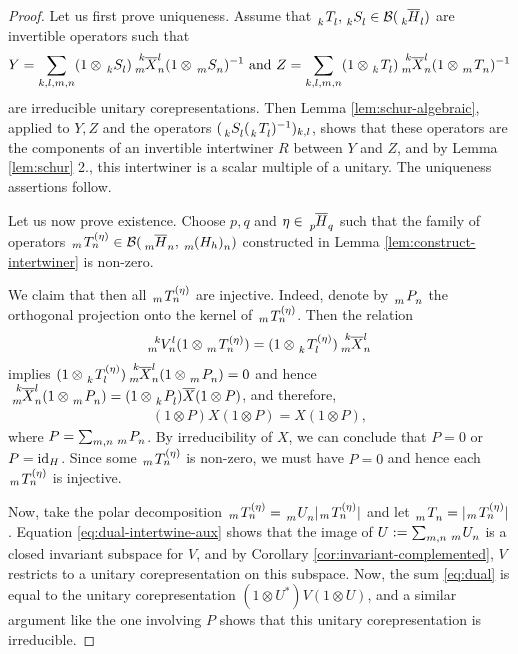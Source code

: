 \begin{proof}
Let us first prove uniqueness. Assume that $\Grd{T}{k}{l},\Grd{S}{k}{l} \in
\mathcal{B}(\Grd{\overline{H}}{k}{l})$ are invertible operators such that
\begin{align*}
  Y = \sum_{k,l,m,n} (1\otimes \Grd{S}{k}{l}) \Gr{\overline{X}}{k}{l}{m}{n} (1 \otimes
  \Grd{S}{m}{n})^{-1}  \text{ and }
  Z = \sum_{k,l,m,n} (1\otimes \Grd{T}{k}{l}) \Gr{\overline{X}}{k}{l}{m}{n} (1 \otimes
  \Grd{T}{m}{n})^{-1}
\end{align*}
are irreducible unitary corepresentations. Then Lemma \ref{lem:schur-algebraic}, applied to $Y,Z$
and the operators $(\Grd{S}{k}{l}(\Grd{T}{k}{l})^{-1})_{k,l}$, shows that these operators are the
components of an invertible intertwiner $R$ between $Y$ and $Z$, and by Lemma \ref{lem:schur} 2.,
this intertwiner is a scalar multiple of a unitary. The uniqueness assertions follow.

Let us now prove existence.  Choose $p,q$ and $\eta\in \Grd{\overline{H}}{p}{q}$ such that the
family of operators $\Gr{T}{}{(\eta)}{m}{n} \in
\mathcal{B}(\Grd{\overline{H}}{m}{n},\Grd{(H_{h})}{m}{n})$ constructed in Lemma
\ref{lem:construct-intertwiner} is non-zero.

We claim that then all $\Gr{T}{}{(\eta)}{m}{n}$ are injective.  Indeed, denote by $\Grd{P} {m}{n}$
the orthogonal projection onto the kernel of $\Gr{T}{}{(\eta)}{m}{n}$. Then the relation
\begin{align} \label{eq:dual-intertwine-aux}
  \Gr{V}{k}{l}{m}{n}(1\otimes \Gr{T}{}{(\eta)}{m}{n}) = (1\otimes \Gr{T}{}{(\eta)}{k}{l})\Gr{\overline{X}}{k}{l}{m}{n}
\end{align}
implies $(1\otimes \Gr{T}{}{(\eta)}{k}{l})\Gr{\overline{X}}{k}{l}{m}{n} (1 \otimes \Grd{P}{m}{n}) =
0$ and hence $\Gr{\overline{X}}{k}{l}{m}{n} (1 \otimes \Grd{P}{m}{n}) = (1 \otimes \Grd{P}{k}{l})
\overline{X}(1 \otimes P)$, and therefore,
\begin{align*}
  (1 \otimes P)X(1\otimes P) = X(1\otimes P),
\end{align*}
where $P=\sum_{m,n} \Grd{P}{m}{n}$.  By irreducibility of $X$, we can conclude that $P=0$ or
$P=\operatorname{id}_{H}$. Since some $\Gr{T}{}{(\eta)}{m}{n}$ is non-zero, we must have $P=0$ and hence each $\Gr{T}{}{(\eta)}{m}{n}$ is injective.

Now, take the polar decomposition $\Gr{T}{}{(\eta)}{m}{n}=\Grd{U}{m}{n} |\Gr{T}{}{(\eta)}{m}{n}|$
and let $\Grd{T}{m}{n}=|\Gr{T}{}{(\eta)}{m}{n}|$.   Equation \eqref{eq:dual-intertwine-aux} shows
that the image of $U:=\sum_{m,n} \Grd{U}{m}{n}$ is a closed invariant subspace for $V$, and by Corollary
\ref{cor:invariant-complemented}, $V$ restricts to a unitary corepresentation on this subspace.
Now, the sum \eqref{eq:dual} is equal to the unitary corepresentation $(1\otimes U^{*})V(1\otimes
U)$, and a similar argument like the one involving $P$ shows that this unitary corepresentation is irreducible.
\end{proof}

